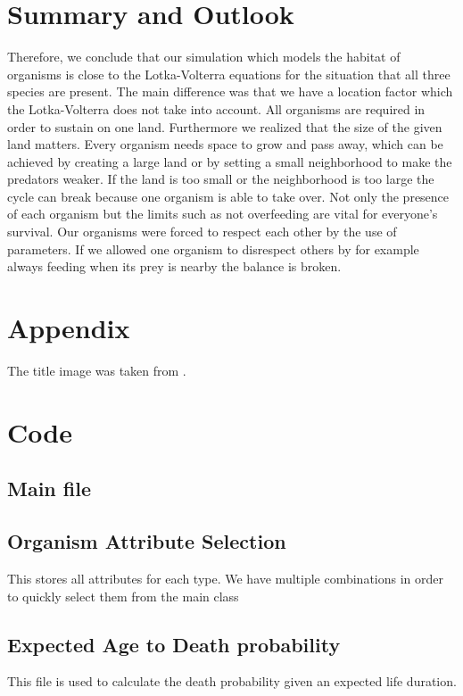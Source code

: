 \documentclass[11pt]{article}
\begin{document}
\section{Summary and Outlook}

Therefore, we conclude that our simulation which models the habitat of organisms is close to the Lotka-Volterra equations for the situation that all three species are present. The main difference was that we have a location factor which the Lotka-Volterra does not take into account. All organisms are required in order to sustain on one land. Furthermore we realized that the size of the given land matters. Every organism needs space to grow and pass away, which can be achieved by creating a large land or by setting a small neighborhood to make the predators weaker. If the land is too small or the neighborhood is too large the cycle can break because one organism is able to take over.  Not only the presence of each organism but the limits such as not overfeeding are vital for everyone's survival. Our organisms were forced to respect each other by the use of parameters. If we allowed one organism to disrespect others by for example always feeding when its prey is nearby the balance is broken.
\appendix

\section{Appendix}
The title image was taken from \cite{titleImage}.

\section{Code}
\subsection{Main file}

\subsection{Organism Attribute Selection}
This stores all attributes for each type. We have multiple combinations in order to quickly select them from the main class

\subsection{Expected Age to Death probability}
This file is used to calculate the death probability given an expected life duration.

\end{document}
